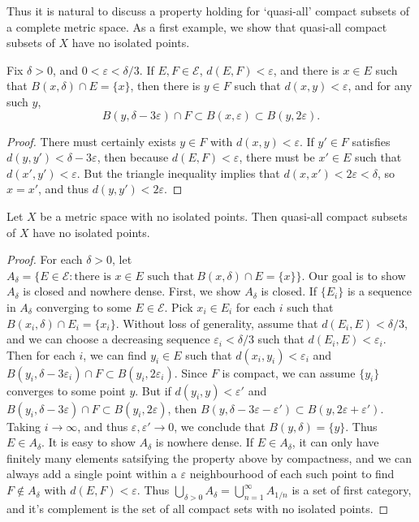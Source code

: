 Thus it is natural to discuss a property holding for `quasi-all' compact subsets of a complete metric space. As a first example, we show that quasi-all compact subsets of $X$ have no isolated points.

\begin{lemma}
	Fix $\delta > 0$, and $0 < \varepsilon < \delta/3$. If $E,F \in \mathcal{E}$, $d(E,F) < \varepsilon$, and there is $x \in E$ such that $B(x,\delta) \cap E = \{ x \}$, then there is $y \in F$ such that $d(x,y) < \varepsilon$, and for any such $y$,
	\[ B(y,\delta - 3\varepsilon) \cap F \subset B(x,\varepsilon) \subset B(y,2\varepsilon). \]
\end{lemma}
\begin{proof}
	There must certainly exists $y \in F$ with $d(x,y) < \varepsilon$. If $y' \in F$ satisfies $d(y,y') < \delta - 3\varepsilon$, then because $d(E,F) < \varepsilon$, there must be $x' \in E$ such that $d(x',y') < \varepsilon$. But the triangle inequality implies that $d(x,x') < 2\varepsilon < \delta$, so $x = x'$, and thus $d(y,y') < 2\varepsilon$.
\end{proof}

\begin{theorem}
	Let $X$ be a metric space with no isolated points. Then quasi-all compact subsets of $X$ have no isolated points.
\end{theorem}
\begin{proof}
	For each $\delta > 0$, let $A_\delta = \{ E \in \mathcal{E}: \text{there is $x \in E$ such that}\ B(x,\delta) \cap E = \{ x \} \}$. Our goal is to show $A_\delta$ is closed and nowhere dense. First, we show $A_\delta$ is closed. If $\{ E_i \}$ is a sequence in $A_\delta$ converging to some $E \in \mathcal{E}$. Pick $x_i \in E_i$ for each $i$ such that $B(x_i,\delta) \cap E_i = \{ x_i \}$. Without loss of generality, assume that $d(E_i, E) < \delta / 3$, and we can choose a decreasing sequence $\varepsilon_i < \delta / 3$ such that $d(E_i,E) < \varepsilon_i$. Then for each $i$, we can find $y_i \in E$ such that $d(x_i,y_i) < \varepsilon_i$ and $B(y_i,\delta - 3 \varepsilon_i) \cap F \subset B(y_i,2\varepsilon_i)$. Since $F$ is compact, we can assume $\{ y_i \}$ converges to some point $y$. But if $d(y_i,y) < \varepsilon'$ and $B(y_i,\delta - 3\varepsilon) \cap F \subset B(y_i,2\varepsilon)$, then $B(y,\delta-3\varepsilon - \varepsilon') \subset B(y,2\varepsilon + \varepsilon')$. Taking $i \to \infty$, and thus $\varepsilon, \varepsilon' \to 0$, we conclude that $B(y,\delta) = \{ y \}$. Thus $E \in A_\delta$. It is easy to show $A_\delta$ is nowhere dense. If $E \in A_\delta$, it can only have finitely many elements satsifying the property above by compactness, and we can always add a single point within a $\varepsilon$ neighbourhood of each such point to find $F \not \in A_\delta$ with $d(E,F) < \varepsilon$. Thus $\bigcup_{\delta > 0} A_\delta = \bigcup_{n = 1}^\infty A_{1/n}$ is a set of first category, and it's complement is the set of all compact sets with no isolated points.
\end{proof}

